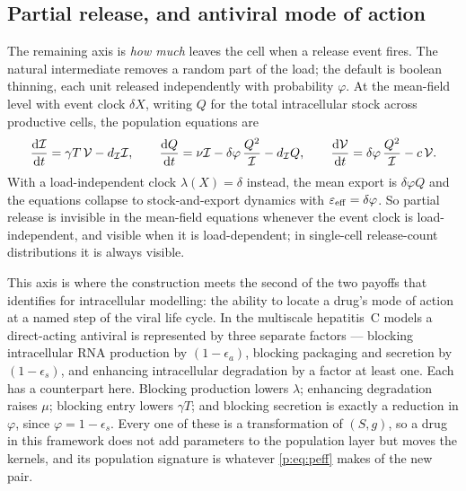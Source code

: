 \subsection{Partial release, and antiviral mode of action}
\label{p:sec:partial}

The remaining axis is \emph{how much} leaves the cell when a release event
fires. The natural intermediate removes a random part of the load; the
default is boolean thinning, each unit released independently with
probability $\varphi$. At the mean-field level with event clock $\delta X$,
writing $Q$ for the total intracellular stock across productive cells, the
population equations are
\begin{equation}
\frac{\mathrm{d} \mathcal{I}}{\mathrm{d} t}=\gamma T\,\mathcal{V}-d_{\mathcal{I}}\mathcal{I},
\qquad
\frac{\mathrm{d} Q}{\mathrm{d} t}=\nu\mathcal{I}-\delta\varphi\,\frac{Q^2}{\mathcal{I}}-d_{\mathcal{I}}Q,
\qquad
\frac{\mathrm{d} \mathcal{V}}{\mathrm{d} t}=\delta\varphi\,\frac{Q^2}{\mathcal{I}}-c\,\mathcal{V}.
\label{p:eq:partial}
\end{equation}
With a load-independent clock $\lambda(X)=\delta$ instead, the mean export is
$\delta\varphi Q$ and the equations collapse to stock-and-export dynamics
with $\varepsilon_{\rm eff}=\delta\varphi$. So partial release is invisible
in the mean-field equations whenever the event clock is load-independent,
and visible when it is load-dependent; in single-cell release-count
distributions it is always visible.

This axis is where the construction meets the second of the two payoffs that
\cite{ciupe2024incorporating} identifies for intracellular modelling: the
ability to locate a drug's mode of action at a named step of the viral life
cycle. In the multiscale hepatitis~C models
\cite{guedj2013modeling,rong2013mathematical} a direct-acting antiviral is
represented by three separate factors --- blocking intracellular RNA
production by $(1-\epsilon_a)$, blocking packaging and secretion by
$(1-\epsilon_s)$, and enhancing intracellular degradation by a factor at
least one. Each has a counterpart here. Blocking production lowers
$\lambda$; enhancing degradation raises $\mu$; blocking entry lowers
$\gamma T$; and blocking secretion is exactly a reduction in $\varphi$,
since $\varphi=1-\epsilon_s$. Every one of these is a transformation of
$(S,g)$, so a drug in this framework does not add parameters to the
population layer but moves the kernels, and its population signature is
whatever \cref{p:eq:peff} makes of the new pair.

